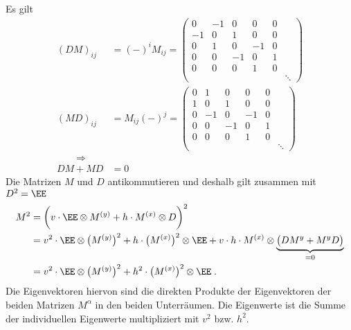 Es gilt
\begin{align*}
    (D M) _{ij} &= (-)^i M_{ij} = \begin{pmatrix}
    0&-1&0&0&0\\
    -1&0&1&0&0\\
    0&1&0&-1&0\\
    0&0&-1&0&1\\
       0& 0&0&1&0\\
       &&&&&\ddots
    \end{pmatrix}\\
    (M D) _{ij} &=  M_{ij}(-)^j = \begin{pmatrix}
    0&1&0&0&0\\
    1&0&1&0&0\\
    0&-1&0&-1&0\\
    0&0&-1&0&1\\
       0& 0&0&1&0\\
       &&&&&\ddots
           \end{pmatrix}\\
           \qquad\Rightarrow\\
       D M + M D &=0
\end{align*}
Die Matrizen $M$ und $D$ antikommutieren und deshalb gilt zusammen mit $D^2=\EE$
\begin{align*}
    M^2 &= \bigg(v\cdot\EE\otimes M^{(y)} + h\cdot  M^{(x)}\otimes D\bigg)^2\\
    &=v^2\cdot \EE\otimes \big(M^{(y)}\big)^2 + h\cdot \big(M^{(x)}\big)^2\otimes \EE + v\cdot h \cdot M^{(x)}\otimes \underbrace{\big(D M^{y} +M^{y} D\big)}_{=0}\\
    &=v^2\cdot \EE\otimes \big(M^{(y)}\big)^2 +  h^2\cdot \big(M^{(x)}\big)^2\otimes \EE\;.
\end{align*}
Die Eigenvektoren hiervon sind die direkten Produkte der Eigenvektoren der beiden Matrizen $M^{\alpha}$ in den beiden Unterräumen.
Die Eigenwerte ist die Summe der individuellen Eigenwerte multipliziert mit $v^2$ bzw. $h^2$.



